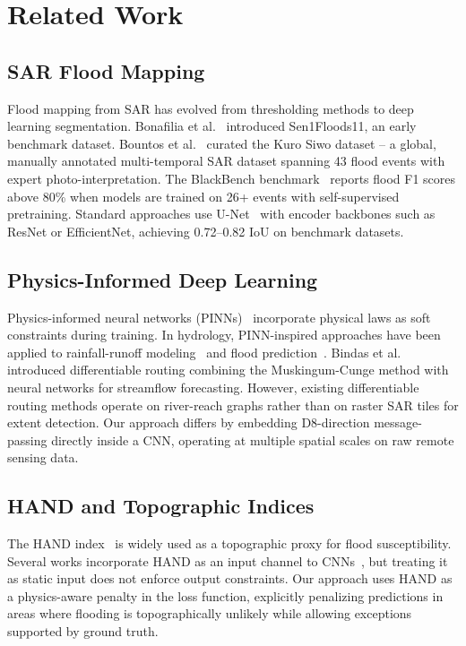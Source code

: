 \documentclass[journal]{IEEEtran}
\begin{document}
\section{Related Work}

\subsection{SAR Flood Mapping}
Flood mapping from SAR has evolved from thresholding methods to deep learning segmentation. Bonafilia et al.~\cite{sen1floods11} introduced Sen1Floods11, an early benchmark dataset. Bountos et al.~\cite{kuro_siwo} curated the Kuro Siwo dataset -- a global, manually annotated multi-temporal SAR dataset spanning 43 flood events with expert photo-interpretation. The BlackBench benchmark~\cite{kuro_siwo} reports flood F1 scores above 80\% when models are trained on 26+ events with self-supervised pretraining. Standard approaches use U-Net~\cite{unet} with encoder backbones such as ResNet or EfficientNet, achieving 0.72--0.82 IoU on benchmark datasets.

\subsection{Physics-Informed Deep Learning}
Physics-informed neural networks (PINNs)~\cite{pinn} incorporate physical laws as soft constraints during training. In hydrology, PINN-inspired approaches have been applied to rainfall-runoff modeling~\cite{kratzert} and flood prediction~\cite{tartakovsky}. Bindas et al.~\cite{bindas} introduced differentiable routing combining the Muskingum-Cunge method with neural networks for streamflow forecasting. However, existing differentiable routing methods operate on river-reach graphs rather than on raster SAR tiles for extent detection. Our approach differs by embedding D8-direction message-passing directly inside a CNN, operating at multiple spatial scales on raw remote sensing data.

\subsection{HAND and Topographic Indices}
The HAND index~\cite{hand} is widely used as a topographic proxy for flood susceptibility. Several works incorporate HAND as an input channel to CNNs~\cite{mmflood,worldfloods}, but treating it as static input does not enforce output constraints. Our approach uses HAND as a physics-aware penalty in the loss function, explicitly penalizing predictions in areas where flooding is topographically unlikely while allowing exceptions supported by ground truth.
\end{document}
